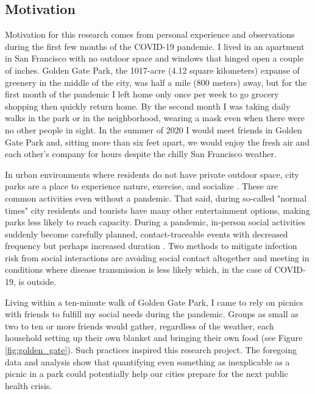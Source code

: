 \begin{multicols}{2}

\section{Motivation}
Motivation for this research comes from personal experience and observations during the first few months of the COVID-19 pandemic. I lived in an apartment in San Francisco with no outdoor space and windows that hinged open a couple of inches. Golden Gate Park, the 1017-acre (4.12 square kilometers) expanse of greenery in the middle of the city, was half a mile (800 meters) away, but for the first month of the pandemic I left home only once per week to go grocery shopping then quickly return home. By the second month I was taking daily walks in the park or in the neighborhood, wearing a mask even when there were no other people in sight. In the summer of 2020 I would meet friends in Golden Gate Park and, sitting more than six feet apart, we would enjoy the fresh air and each other's company for hours despite the chilly San Francisco weather. 

In urban environments where residents do not have private outdoor space, city parks are a place to experience nature, exercise, and socialize \cite{geng_impacts_2021}. These are common activities even without a pandemic. That said, during so-called "normal times" city residents and tourists have many other entertainment options, making parks less likely to reach capacity. During a pandemic, in-person social activities suddenly become carefully planned, contact-traceable events with decreased frequency but perhaps increased duration \cite{sundara_rajoo_addressing_2021}. Two methods to mitigate infection risk from social interactions are avoiding social contact altogether and meeting in conditions where disease transmission is less likely which, in the case of COVID-19, is outside.  

Living within a ten-minute walk of Golden Gate Park, I came to rely on picnics with friends to fulfill my social needs during the pandemic. Groups as small as two to ten or more friends would gather, regardless of the weather, each household setting up their own blanket and bringing their own food (see Figure \ref{fig:golden_gate}). Such practices inspired this research project. The foregoing data and analysis show that quantifying even something as inexplicable as a picnic in a park could potentially help our cities prepare for the next public health crisis.   

\end{multicols}

